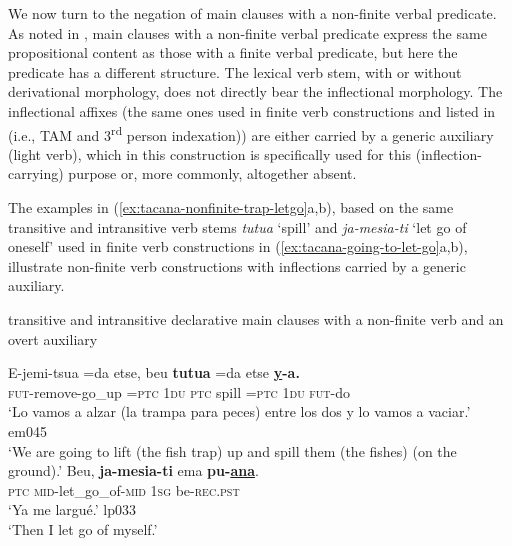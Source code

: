 \documentclass[output=paper]{langsci/langscibook}
\begin{document}
We now turn to the negation of main clauses with a non-finite verbal
predicate. As noted in , main clauses with a
non-finite verbal predicate express the same propositional content as those
with a finite verbal predicate, but here the predicate has a different
structure. The lexical verb stem, with or without derivational morphology,
does not directly bear the inflectional morphology. The inflectional
affixes (the same ones used in finite verb constructions and listed in
 (i.e., TAM and 3\textsuperscript{rd}
person indexation)) are
either carried by a generic auxiliary (light verb), which in this
construction is specifically used for this (inflection-carrying) purpose
or, more commonly, altogether absent.

The examples in (\ref{ex:tacana-nonfinite-trap-letgo}a,b), based on the
same transitive and intransitive verb stems \textit{tutua} `spill' and
\textit{ja-mesia-ti} `let go of oneself' used in finite verb constructions
in (\ref{ex:tacana-going-to-let-go}a,b), illustrate non-finite verb
constructions with inflections carried by a generic auxiliary.

\begin{exe}\ex \label{ex:tacana-nonfinite-trap-letgo}  transitive and
intransitive declarative main clauses with a non-finite verb and an overt
auxiliary 
\begin{xlist}
\ex\label{ex:tacana-nonfinite-trap}
\gll   E-jemi-tsua   =da  etse,  beu
\textbf{tutua} =da
etse \textbf{\uline{y}-a.}\\
    \textsc{fut}-remove-go\_up  \textsc{=ptc}  \textsc{1du} 
    \textsc{ptc}  spill  =\textsc{ptc}  \textsc{1du}  \textsc{fut-}do\\
\glt `Lo vamos a alzar (la trampa para peces) entre los dos y
lo vamos a vaciar.' em045\\
`We are going to lift (the fish trap) up and spill them (the fishes)
(on the ground).'
\ex\label{ex:tacana-nonfinite-letgo}
\gll  Beu,
\textbf{ja-mesia-ti}
ema \textbf{pu-\uline{ana}}.\\
    \textsc{ptc}  \textsc{mid-}let\_go\_of-\textsc{mid}  \textsc{1sg}
    be\textsc{-rec.pst}\\
\glt `Ya me largué.' lp033\\
`Then I let go of myself.'
\end{xlist}\end{exe}
\end{document}
